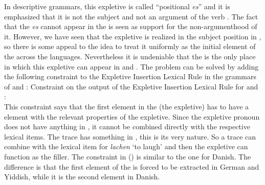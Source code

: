 \eal
{}
\zl
In  descriptive grammars, this expletive is called ``positional \emph{es}'' and it is emphasized that it is
not the subject and not an argument of the verb \parencites[, 177, 371]{Eisenberg2004a}[§1263]{Duden2005-Authors}. The fact that the \emph{es} cannot appear in the
\mf is seen as support for the non-argumenthood of it. However, we have seen that the expletive is
realized in the subject position in , so there is some appeal to the idea to treat it
uniformly as the initial element of the \argstl across the  languages. Nevertheless it is
undeniable that the \vf is the only place in which this expletive can appear in  and .
The problem can be solved by adding the following constraint to the Expletive Insertion Lexical Rule
in the grammars of  and :
\ea
Constraint on the output of the Expletive Insertion Lexical Rule for  and :\\
\z
This constraint says that the first element in the \argstl (the expletive) has to have a \slasch
element with the relevant properties of the expletive. Since the expletive pronoun does not have
anything in \slasch, it cannot be combined directly with the respective lexical items. The trace has
something in \slasch, this is its very nature. So a trace can combine with the lexical item for
\emph{lachen} `to laugh' and then the expletive can function as the filler. The constraint in
() is similar to the one for Danish. The difference is that the first element of the \argstl
is forced to be extracted in German and Yiddish, while it is the second element in Danish. 

